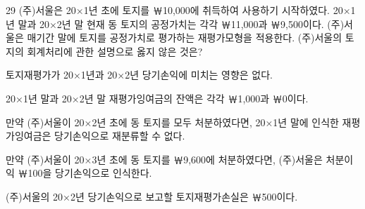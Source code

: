 \begin{question}{29}
(주)서울은 20×1년 초에 토지를 ￦10,000에 취득하여 사용하기 시작하였다. 20×1년 말과 20×2년 말 현재 동 토지의 공정가치는 각각 ￦11,000과 ￦9,500이다. (주)서울은 매기간 말에 토지를 공정가치로 평가하는 재평가모형을 적용한다. (주)서울의 토지의 회계처리에 관한 설명으로 옳지 않은 것은?
\begin{choices}
  \item 토지재평가가 20×1년과 20×2년 당기손익에 미치는 영향은 없다.
  \item 20×1년 말과 20×2년 말 재평가잉여금의 잔액은 각각 ￦1,000과 ￦0이다.
  \item 만약 (주)서울이 20×2년 초에 동 토지를 모두 처분하였다면, 20×1년 말에 인식한 재평가잉여금은 당기손익으로 재분류할 수 없다.
  \item 만약 (주)서울이 20×3년 초에 동 토지를 ￦9,600에 처분하였다면, (주)서울은 처분이익 ￦100을 당기손익으로 인식한다.
  \item (주)서울의 20×2년 당기손익으로 보고할 토지재평가손실은 ￦500이다.
\end{choices}
\end{question}
